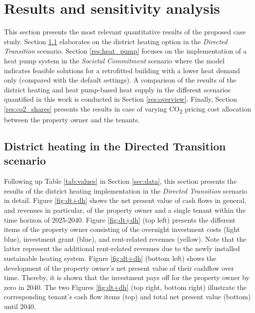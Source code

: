 \section{Results and sensitivity analysis}\label{results}
This section presents the most relevant quantitative results of the proposed case study. Section \ref{res:district_heating} elaborates on the district heating option in the \textit{Directed Transition} scenario. Section \ref{res:heat_pump} focuses on the implementation of a heat pump system in the \textit{Societal Commitment} scenario where the model indicates feasible solutions for a retrofitted building with a lower heat demand only (compared with the default settings). A comparison of the results of the district heating and heat pump-based heat supply in the different scenarios quantified in this work is conducted in Section \ref{res:overview}. Finally, Section \ref{res:co2_shares} presents the results in case of varying CO\textsubscript{2} pricing cost allocation between the property owner and the tenants. 

\subsection{District heating in the Directed Transition scenario}\label{res:district_heating}
Following up Table \ref{tab:values} in Section \ref{sec:data}, this section presents the results of the district heating implementation in the \textit{Directed Transition} scenario in detail. Figure \ref{fig:dt+dh} shows the net present value of cash flows in general, and revenues in particular, of the property owner and a single tenant within the time horizon of 2025-2040. Figure \ref{fig:dt+dh} (top left) presents the different items of the property owner consisting of the overnight investment costs (light blue), investment grant (blue), and rent-related revenues (yellow). Note that the latter represent the additional rent-related revenues due to the newly installed sustainable heating system. Figure \ref{fig:dt+dh} (bottom left) shows the development of the property owner's net present value of their cashflow over time. Thereby, it is shown that the investment pays off for the property owner by zero in 2040. The two Figures \ref{fig:dt+dh} (top right, bottom right) illustrate the corresponding tenant's cash flow items (top) and total net present value (bottom) until 2040. 

